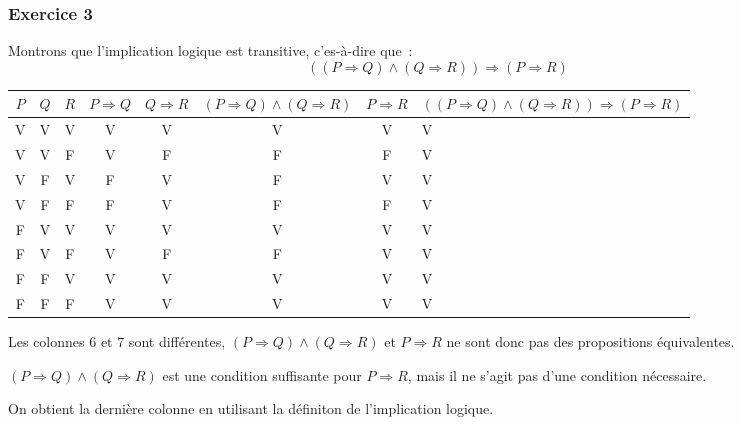 \documentclass[10pt,notheorems]{beamer}
\theoremstyle{plain}
\theoremstyle{definition} %
\begin{document}
\begin{frame}
  \frametitle{Exercice 3}
  \fontsize{8}{10}\selectfont

  Montrons que l'implication logique est transitive, c'es-à-dire que~:
    \[
      ((P \Rightarrow Q) \land (Q \Rightarrow R)) \Rightarrow (P \Rightarrow R)
    \]
    \fontsize{4}{5}\selectfont
    \begin{table}[H]
    \begin{tabular}[H]{|ccc|ccccg|}
      \hline
      $P$ & $Q$ & $R$ & $P\Rightarrow Q$ & $Q\Rightarrow R$ & $(P\Rightarrow Q) \land (Q\Rightarrow R)$ & $P\Rightarrow R$ & $((P\Rightarrow Q) \land (Q\Rightarrow R))\Rightarrow (P\Rightarrow R)$\\ \hline
      V & V & V & V & V & V & V & V \\
      V & V & F & V & F & F & F & V \\
      V & F & V & F & V & F & V & V \\
      V & F & F & F & V & F & F & V \\
      F & V & V & V & V & V & V & V \\
      F & V & F & V & F & F & V & V \\
      F & F & V & V & V & V & V & V \\
      F & F & F & V & V & V & V & V \\
      \hline\hline
    \end{tabular}
  \end{table}
  \fontsize{8}{10}\selectfont
  \bigskip
  {\tiny \textdbend} Les colonnes 6 et 7 sont différentes, $(P \Rightarrow Q) \land (Q \Rightarrow R)$ et $P \Rightarrow R$ ne sont donc pas des propositions équivalentes.\newline

  $(P \Rightarrow Q) \land (Q \Rightarrow R)$ est une condition suffisante pour $P \Rightarrow R$, mais il ne s'agit pas d'une condition nécessaire.\newline

  On obtient la dernière colonne en utilisant la définiton de l'implication logique.

\end{frame}
\end{document}

